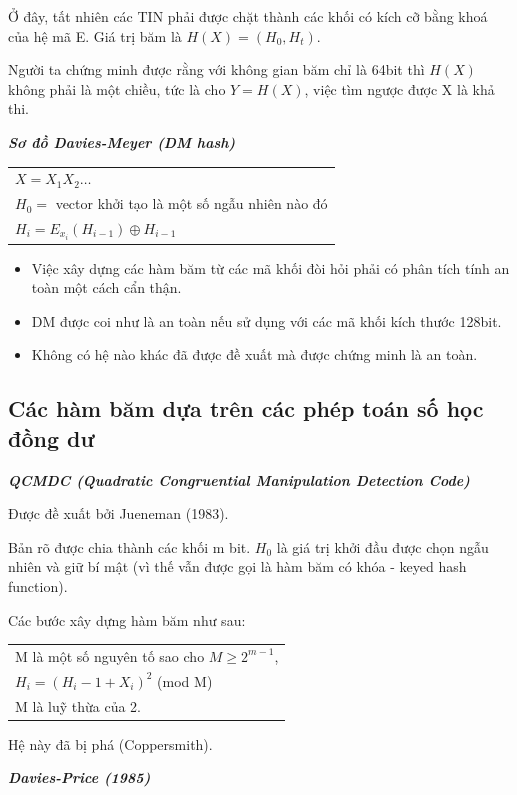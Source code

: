 \documentclass[a4paper,12pt]{report}
\begin{document}
Ở đây, tất nhiên các TIN phải được chặt thành các khối có kích cỡ bằng khoá của hệ mã E. Giá trị băm là $H(X) = (H_0,H_t)$.

Người ta chứng minh được rằng với không gian băm chỉ là 64bit thì $H(X)$ không phải là một chiều, tức là cho $Y=H(X)$, việc tìm ngược được X là khả thi.

\textbf{\textit{Sơ đồ Davies-Meyer (DM hash)}}
\begin{center}
\begin{tabular}{l}
$X = X_1 X_2 \ldots$ \\
$H_0 = $ vector khởi tạo là một số ngẫu nhiên nào đó \\
$H_i = E_{x_i}(H_{i-1}) \oplus H_{i-1}$	 \\
\end{tabular}
\end{center}
\begin{itemize}
\item Việc xây dựng các hàm băm từ các mã khối đòi hỏi phải có phân tích tính an toàn một cách cẩn thận.
\item DM được coi như là an toàn nếu sử dụng với các mã khối kích thước 128bit.
\item Không có hệ nào khác đã được đề xuất mà được chứng minh là an toàn.
\end{itemize}
\subsection*{Các hàm băm dựa trên các phép toán số học đồng dư}
\textbf{\textit{QCMDC (Quadratic Congruential Manipulation Detection Code)}}

Được đề xuất bởi Jueneman (1983).

Bản rõ được chia thành các khối m bit. $H_0$ là giá trị khởi đầu được chọn ngẫu nhiên và giữ bí mật (vì thế vẫn được gọi là hàm băm có khóa - keyed hash function).

Các bước xây dựng hàm băm như sau:
\begin{center}
\begin{tabular}{l}
M là một số nguyên tố sao cho $M \geq 2^{m-1}$, \\ 
$H_i = (H_i - 1 + X_i)^2$ (mod M) \\
M là luỹ thừa của 2.
\end{tabular}
\end{center}

Hệ này đã bị phá (Coppersmith).

\textbf{\textit{Davies-Price (1985)}}
\end{document}
